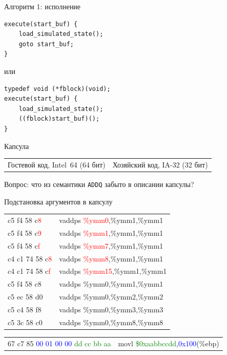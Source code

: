 \documentclass{beamer}
\begin{document}
\begin{frame}[fragile]{Алгоритм 1: исполнение}

\begin{verbatim}
execute(start_buf) {
    load_simulated_state();
    goto start_buf;
}
\end{verbatim}
\pause
или
\begin{verbatim}
typedef void (*fblock)(void);
execute(start_buf) {
    load_simulated_state();
    ((fblock)start_buf)();
}
\end{verbatim}

\end{frame}

\begin{frame}{Капсула}

\begin{small}
\begin{tabular}{p{}p{}}
Гостевой код, Intel~64 (64 бит) & Хозяйский код, IA-32 (32 бит)
\end{tabular}
\end{small}

\vfill

\centering
\pause

Вопрос: что из семантики \texttt{ADDQ} забыто в описании капсулы?
\end{frame}

\begin{frame}{Подстановка аргументов в капсулу}


{\ttfamily\small
\begin{tabular}{ll}
    
c5 f4 58 c\textcolor{red}{8}  &    vaddps \textcolor{red}{\%ymm0},\%ymm1,\%ymm1 \\
c5 f4 58 c\textcolor{red}{9}  &    vaddps \textcolor{red}{\%ymm1},\%ymm1,\%ymm1 \\
c5 f4 58 c\textcolor{red}{f}  &    vaddps \textcolor{red}{\%ymm7},\%ymm1,\%ymm1 \\
c4 c1 74 58 c\textcolor{red}{8} &  vaddps \textcolor{red}{\%ymm8},\%ymm1,\%ymm1 \\
c4 c1 74 58 c\textcolor{red}{f} &  vaddps \textcolor{red}{\%ymm15},\%ymm1,\%ymm1 \\
c5 f4 58 c8  &    vaddps \%ymm0,\%ymm1,\%ymm1 \\
c5 ec 58 d0  &    vaddps \%ymm0,\%ymm2,\%ymm2 \\
c5 c4 58 f8  &    vaddps \%ymm0,\%ymm3,\%ymm3 \\
c5 3c 58 c0  &    vaddps \%ymm0,\%ymm8,\%ymm8 \\

\end{tabular}

\begin{tabular}{ll}
67 c7 85 \textcolor{blue}{00 01 00 00} \textcolor{green}{dd cc bb aa}   & movl \textcolor{green}{\$0xaabbccdd},\textcolor{blue}{0x100}(\%ebp)
\end{tabular}
} %


\end{frame}
\end{document}
